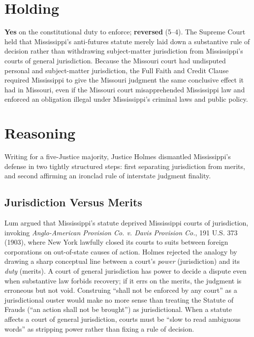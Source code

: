 \documentclass[12pt]{article}
\begin{document}
\section{Holding}

\textbf{Yes} on the constitutional duty to enforce; \textbf{reversed} (5--4). The Supreme Court held that Mississippi's anti-futures statute merely laid down a substantive rule of decision rather than withdrawing subject-matter jurisdiction from Mississippi's courts of general jurisdiction. Because the Missouri court had undisputed personal and subject-matter jurisdiction, the Full Faith and Credit Clause required Mississippi to give the Missouri judgment the same conclusive effect it had in Missouri, even if the Missouri court misapprehended Mississippi law and enforced an obligation illegal under Mississippi's criminal laws and public policy.

\section{Reasoning}

Writing for a five-Justice majority, Justice Holmes dismantled Mississippi's defense in two tightly structured steps: first separating jurisdiction from merits, and second affirming an ironclad rule of interstate judgment finality.

\subsection{Jurisdiction Versus Merits}
Lum argued that Mississippi's statute deprived Mississippi courts of jurisdiction, invoking \textit{Anglo-American Provision Co. v. Davis Provision Co.}, 191 U.S. 373 (1903), where New York lawfully closed its courts to suits between foreign corporations on out-of-state causes of action. Holmes rejected the analogy by drawing a sharp conceptual line between a court's \textit{power} (jurisdiction) and its \textit{duty} (merits). A court of general jurisdiction has power to decide a dispute even when substantive law forbids recovery; if it errs on the merits, the judgment is erroneous but not void. Construing ``shall not be enforced by any court'' as a jurisdictional ouster would make no more sense than treating the Statute of Frauds (``an action shall not be brought'') as jurisdictional. When a statute affects a court of general jurisdiction, courts must be ``slow to read ambiguous words'' as stripping power rather than fixing a rule of decision.
\end{document}
